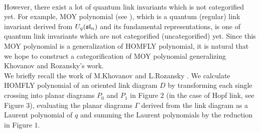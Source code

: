 \documentclass[10pt]{amsart}
\theoremstyle{break}
\begin{document}
\\ 
\indent However, there exist a lot of quantum link invariants which is not categorified yet. For example, MOY polynomial (see \cite{MOY}), which is a quantum (regular) link invariant derived from $U_q(\frak{sl}_n)$ and its fundamental representations, is one of quantum link invariants which are not categorified (uncategorified) yet.
Since this MOY polynomial is a generalization of HOMFLY polynomial, it is natural that we hope to construct a categorification of MOY polynomial generalizing Khovanov and Rozansky's work. \\
\indent We briefly recall the work of M.Khovanov and L.Rozansky \cite{KR1}. We calculate HOMFLY polynomial of an oriented link diagram $D$ by transforming each single crossing into planar diagrams $P_0$ and $P_1$ in Figure $2$ (in the case of Hopf link, see Figure $3$), evaluating the planar diagrams $\Gamma$ derived from the link diagram as a Laurent polynomial of $q$ and summing the Laurent polynomials by the reduction in Figure $1$. \\
\end{document}
